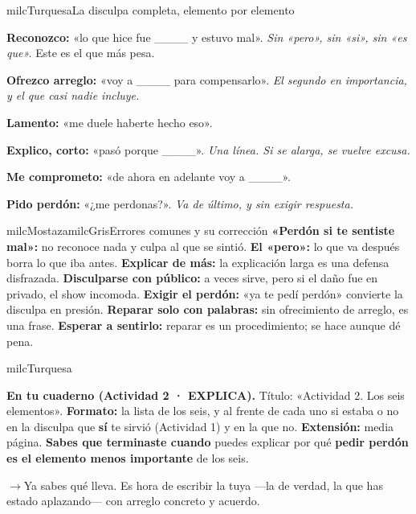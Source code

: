 \documentclass[11pt,letterpaper]{article}
\newcommand{\puente}[1]{%
  \begin{puentebox}%
    \textcolor{milcGradeDark}{$\rightarrow$}\hspace{2mm}#1%
  \end{puentebox}%
}
\begin{document}
\begin{drawbox}{milcTurquesa}{La disculpa completa, elemento por elemento}
\begin{pasoslista}
\item \textbf{Reconozco:} «lo que hice fue \_\_\_\_ y estuvo mal». \emph{Sin «pero», sin «si», sin «es que».} Este es el que más pesa.
\item \textbf{Ofrezco arreglo:} «voy a \_\_\_\_ para compensarlo». \emph{El segundo en importancia, y el que casi nadie incluye.}
\item \textbf{Lamento:} «me duele haberte hecho eso».
\item \textbf{Explico, corto:} «pasó porque \_\_\_\_». \emph{Una línea. Si se alarga, se vuelve excusa.}
\item \textbf{Me comprometo:} «de ahora en adelante voy a \_\_\_\_».
\item \textbf{Pido perdón:} «¿me perdonas?». \emph{Va de último, y sin exigir respuesta.}
\end{pasoslista}
\end{drawbox}

\begin{softbox}{milcMostaza}{milcGris}{Errores comunes y su corrección}
\textbf{«Perdón si te sentiste mal»:} no reconoce nada y culpa al que se sintió. \textbf{El «pero»:} lo que va después borra lo que iba antes. \textbf{Explicar de más:} la explicación larga es una defensa disfrazada. \textbf{Disculparse con público:} a veces sirve, pero si el daño fue en privado, el show incomoda. \textbf{Exigir el perdón:} «ya te pedí perdón» convierte la disculpa en presión. \textbf{Reparar solo con palabras:} sin ofrecimiento de arreglo, es una frase. \textbf{Esperar a sentirlo:} reparar es un procedimiento; se hace aunque dé pena.
\end{softbox}

\begin{infoband}{milcTurquesa}


\textbf{En tu cuaderno (Actividad 2 · EXPLICA).} Título: «Actividad 2. Los seis elementos». \textbf{Formato:} la lista de los seis, y al frente de cada uno si estaba o no en la disculpa que \textbf{sí} te sirvió (Actividad 1) y en la que no. \textbf{Extensión:} media página. \textbf{Sabes que terminaste cuando} puedes explicar por qué \textbf{pedir perdón es el elemento menos importante} de los seis.
\end{infoband}

\puente{Ya sabes qué lleva. Es hora de escribir la tuya ---la de verdad, la que has estado aplazando--- con arreglo concreto y acuerdo.}
\end{document}
